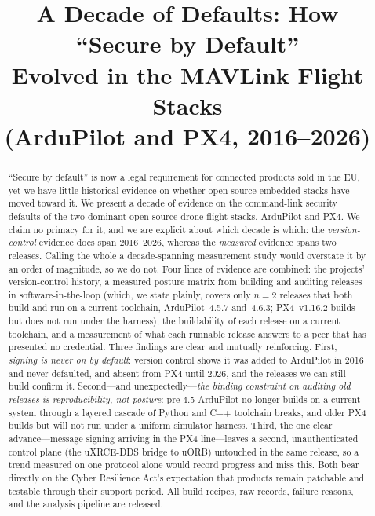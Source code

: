 \documentclass[conference]{IEEEtran}
\begin{document}
\title{A Decade of Defaults: How ``Secure by Default''\\ Evolved in the MAVLink Flight Stacks\\ (ArduPilot and PX4, 2016--2026)}

\author{
}
\maketitle

\begin{abstract}
``Secure by default'' is now a legal requirement for connected products sold in
the EU, yet we have little historical evidence on whether open-source embedded
stacks have moved toward it. We present a decade of evidence on the
command-link security defaults of the two dominant open-source drone flight
stacks, ArduPilot and PX4. We claim no primacy for it, and we are explicit
about which decade is which: the \emph{version-control} evidence does span
2016--2026, whereas the \emph{measured} evidence spans two releases. Calling
the whole a decade-spanning measurement study would overstate it by an order of
magnitude, so we do not. Four lines of evidence are combined: the projects' version-control history, a measured posture matrix from
building and auditing releases in software-in-the-loop (which, we state plainly,
covers only $n{=}2$ releases that both build and run on a current toolchain,
ArduPilot~4.5.7 and~4.6.3; PX4~v1.16.2 builds but does not run under the
harness), the buildability of each release on a current toolchain, and a
measurement of what each runnable release answers to a peer that has presented no
credential. Three
findings are clear and mutually reinforcing. First,
\emph{signing is never on by default}: version control shows it was added to
ArduPilot in 2016 and never defaulted, and absent from PX4 until 2026, and the
releases we can still build confirm it. Second---and unexpectedly---\emph{the
binding constraint on auditing old releases is reproducibility, not posture}:
pre-4.5 ArduPilot no longer builds on a current system through a layered cascade
of Python and C++ toolchain breaks, and older PX4 builds but will not run under a
uniform simulator harness. Third, the one clear advance---message signing
arriving in the PX4 line---leaves a second, unauthenticated control plane (the
uXRCE-DDS bridge to uORB) untouched in the same release, so a trend measured on
one protocol alone would record progress and miss this. Both bear directly on the Cyber Resilience Act's
expectation that products remain patchable and testable through their support
period. All build recipes, raw records, failure reasons, and the analysis
pipeline are released.
\end{abstract}
\end{document}
